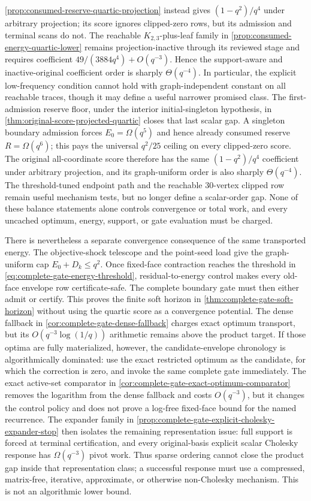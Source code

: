 \begin{enumerate}[leftmargin=2em]
\cref{prop:consumed-reserve-quartic-projection} instead gives
$(1-q^2)/q^4$ under arbitrary projection; its score ignores clipped-zero
rows, but its admission and terminal scans do not.  The reachable
$K_{2,3}$-plus-leaf family in
\cref{prop:consumed-energy-quartic-lower} remains projection-inactive through
its reviewed stage and requires coefficient
$49/(3884q^4)+O(q^{-3})$.  Hence the support-aware and inactive-original
coefficient order is sharply $\Theta(q^{-4})$.  In particular, the explicit
low-frequency condition cannot hold with graph-independent constant on all
reachable traces, though it may define a useful narrower promised class.  The
first-admission reserve floor, under the interior initial-singleton hypothesis, in
\cref{thm:original-score-projected-quartic} closes that last scalar gap.  A
singleton boundary admission forces $E_0=\Omega(q^5)$ and hence already
consumed reserve $R=\Omega(q^6)$; this pays the universal $q^2/25$ ceiling on
every clipped-zero score.  The original all-coordinate score therefore has
the same $(1-q^2)/q^4$ coefficient under arbitrary projection, and its
graph-uniform order is also sharply $\Theta(q^{-4})$.  The threshold-tuned
endpoint path and the reachable 30-vertex clipped row remain useful
mechanism tests, but no longer define a scalar-order gap.  None of these balance statements
alone
controls convergence or total work, and every uncached optimum, energy,
support, or gate evaluation must be charged.

There is nevertheless a separate convergence consequence of the same
transported energy.  The objective-shock telescope and the point-seed load
give the graph-uniform cap $E_0+D_k\leq q^2$.  Once fixed-face contraction
reaches the threshold in
\cref{eq:complete-gate-energy-threshold}, residual-to-energy control makes
every old-face envelope row certificate-safe.  The complete boundary gate
must then either admit or certify.  This proves the finite soft horizon in
\cref{thm:complete-gate-soft-horizon} without using the quartic score as a
convergence potential.  The dense fallback in
\cref{cor:complete-gate-dense-fallback} charges exact optimum transport, but
its $O(q^{-3}\log(1/q))$ arithmetic remains above the product target.
If those optima are fully materialized, however, the candidate-envelope
chronology is algorithmically dominated: use the exact restricted optimum as
the candidate, for which the correction is zero, and invoke the same complete
gate immediately.  The exact active-set comparator in
\cref{cor:complete-gate-exact-optimum-comparator} removes the logarithm from
the dense fallback and costs $O(q^{-3})$, but it changes the control policy
and does not prove a log-free fixed-face bound for the named recurrence.
The expander family in
\cref{prop:complete-gate-explicit-cholesky-expander-stop} then isolates the
remaining representation issue: full support is forced at terminal
certification, and every original-basis explicit scalar Cholesky response has
$\Omega(q^{-3})$ pivot work.  Thus sparse ordering cannot close the product
gap inside that representation class; a successful response must use a
compressed, matrix-free, iterative, approximate, or otherwise non-Cholesky
mechanism.  This is not an algorithmic lower bound.
\end{enumerate}
